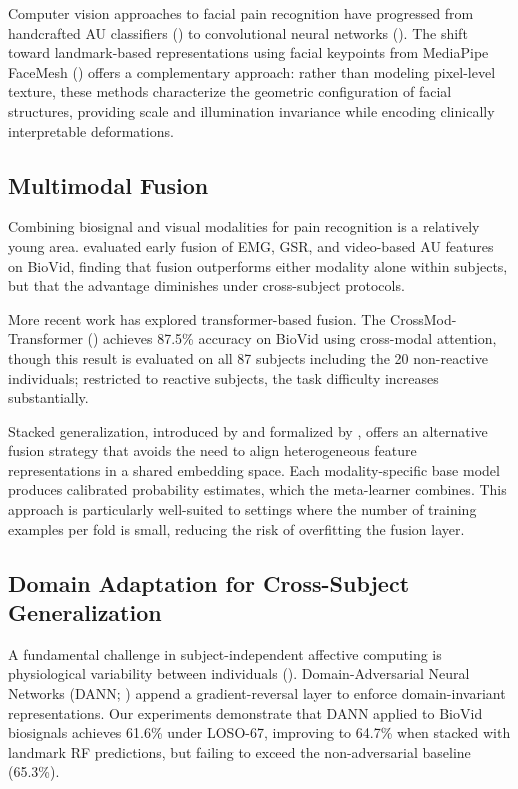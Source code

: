 \documentclass[10pt, twocolumn]{article}
\begin{document}
Computer vision approaches to facial pain recognition have progressed from handcrafted AU
classifiers (\cite{Lucey2011}) to convolutional neural networks (\cite{Rodriguez2017}).
The shift toward landmark-based representations using facial keypoints from MediaPipe
FaceMesh (\cite{Lugaresi2019}) offers a complementary approach: rather than modeling
pixel-level texture, these methods characterize the geometric configuration of facial
structures, providing scale and illumination invariance while encoding clinically
interpretable deformations.

\subsection{Multimodal Fusion}

Combining biosignal and visual modalities for pain recognition is a relatively young area.
\textcite{Gruss2015} evaluated early fusion of EMG, GSR, and video-based AU features on
BioVid, finding that fusion outperforms either modality alone within subjects, but that
the advantage diminishes under cross-subject protocols.

More recent work has explored transformer-based fusion. The CrossMod-Transformer
(\cite{Farmani2025}) achieves 87.5\% accuracy on BioVid using cross-modal attention, though
this result is evaluated on all 87 subjects including the 20 non-reactive individuals;
restricted to reactive subjects, the task difficulty increases substantially.

Stacked generalization, introduced by \textcite{Wolpert1992} and formalized by
\textcite{Breiman1996}, offers an alternative fusion strategy that avoids the need to
align heterogeneous feature representations in a shared embedding space. Each
modality-specific base model produces calibrated probability estimates, which the
meta-learner combines. This approach is particularly well-suited to settings where the
number of training examples per fold is small, reducing the risk of overfitting the fusion
layer.

\subsection{Domain Adaptation for Cross-Subject Generalization}

A fundamental challenge in subject-independent affective computing is physiological
variability between individuals (\cite{Turk2010}). Domain-Adversarial Neural Networks
(DANN; \cite{Ganin2016}) append a gradient-reversal layer to enforce domain-invariant
representations. Our experiments demonstrate that DANN applied to BioVid biosignals
achieves 61.6\% under LOSO-67, improving to 64.7\% when stacked with landmark RF
predictions, but failing to exceed the non-adversarial baseline (65.3\%).
\end{document}
